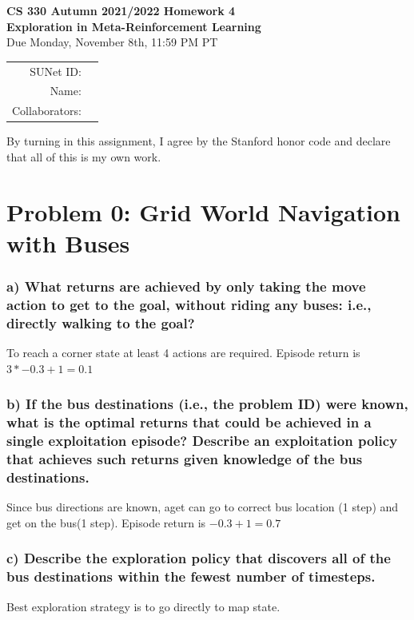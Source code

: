 \documentclass[12pt]{article}
\begin{document}
\begin{center}
{{\Large \textbf{CS 330 Autumn 2021/2022 Homework 4 \\ Exploration in Meta-Reinforcement Learning}}
\\ {\large Due Monday, November 8th, 11:59 PM PT}}

\begin{tabular}{rl}
SUNet ID: &  \\
Name: & \\
Collaborators: & 
\end{tabular}
\end{center}

By turning in this assignment, I agree by the Stanford honor code and declare that all of this is my own work.

\newpage
\section*{Problem 0: Grid World Navigation with Buses}

\subsubsection*{a) What returns are achieved by only taking the move action to get to the goal, without riding any buses: i.e., directly walking to the goal?}

To reach a corner state at least 4 actions are required. Episode return is $3 * -0.3 + 1 = 0.1$

\subsubsection*{b) If the bus destinations (i.e., the problem ID) were known, what is the optimal returns
that could be achieved in a single exploitation episode? Describe an exploitation
policy that achieves such returns given knowledge of the bus destinations.}

Since bus directions are known, aget can go to correct bus location (1 step) and get on the bus(1 step).
Episode return is $ -0.3 + 1 = 0.7 $

\subsubsection*{c) Describe the exploration policy that discovers all of the bus destinations within the fewest number of timesteps.}

Best exploration strategy is to go directly to map state.
\end{document}
